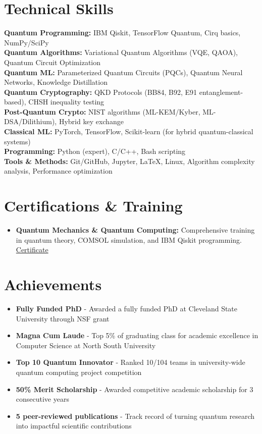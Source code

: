\documentclass[10pt,letter]{article}
\newcommand{\resumeItem}[1]{
  \item\small{
    {#1 \vspace{-2pt}}
  }
}
\newcommand{\resumeItemListStart}{\begin{itemize}}
\newcommand{\resumeItemListEnd}{\end{itemize}\vspace{-5pt}}
\begin{document}
\section{Technical Skills}
 \begin{itemize}[leftmargin=0.15in, label={}]
    \small{\item{
     \textbf{Quantum Programming:} IBM Qiskit, TensorFlow Quantum, Cirq basics, NumPy/SciPy\\
     \textbf{Quantum Algorithms:} Variational Quantum Algorithms (VQE, QAOA), Quantum Circuit Optimization\\
     \textbf{Quantum ML:} Parameterized Quantum Circuits (PQCs), Quantum Neural Networks, Knowledge Distillation\\
     \textbf{Quantum Cryptography:} QKD Protocols (BB84, B92, E91 entanglement-based), CHSH inequality testing\\
     \textbf{Post-Quantum Crypto:} NIST algorithms (ML-KEM/Kyber, ML-DSA/Dilithium), Hybrid key exchange\\
     \textbf{Classical ML:} PyTorch, TensorFlow, Scikit-learn (for hybrid quantum-classical systems)\\
     \textbf{Programming:} Python (expert), C/C++, Bash scripting\\
     \textbf{Tools \& Methods:} Git/GitHub, Jupyter, LaTeX, Linux, Algorithm complexity analysis, Performance optimization
    }}
 \end{itemize}
\section{Certifications \& Training}
  \resumeItemListStart
    \resumeItem{\textbf{Quantum Mechanics \& Quantum Computing:} Comprehensive training in quantum theory, COMSOL simulation, and IBM Qiskit programming. \href{https://drive.google.com/file/d/1Lbl7eVo1facbWTuNTP8q5OGIX1OYPPnu/view?usp=sharing}{Certificate}}
  \resumeItemListEnd

\section{Achievements}
  \resumeItemListStart
      \resumeItem{\textbf{Fully Funded PhD} - Awarded a fully funded PhD at Cleveland State University through NSF grant}
    \resumeItem{\textbf{Magna Cum Laude} - Top 5\% of graduating class for academic excellence in Computer Science at North South University}
    \resumeItem{\textbf{Top 10 Quantum Innovator} - Ranked 10/104 teams in university-wide quantum computing project competition}
    \resumeItem{\textbf{50\% Merit Scholarship} - Awarded competitive academic scholarship for 3 consecutive years}
    \resumeItem{\textbf{5 peer-reviewed publications} - Track record of turning quantum research into impactful scientific contributions}

  \resumeItemListEnd
\end{document}
